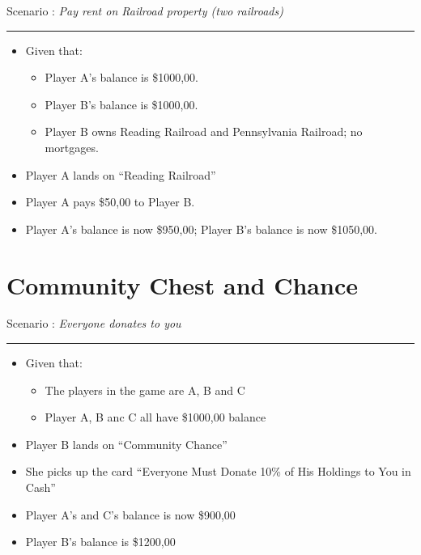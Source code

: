 \documentclass[handout,t,12pt]{beamer}
\newcommand{\Square}[1]{``#1''}
\newcommand{\Card}[1]{``#1''}
\newcommand{\money}[1]{\$#1,00}
\newcounter{scenarioid}\setcounter{scenarioid}{0}
\newenvironment{scenario}[1]{%
\addtocounter{scenarioid}{1} 
{\Large Scenario \thescenarioid: \emph{#1}\\[3px]\hrule}
\vspace{1\bigskipamount}
}{%
}
\begin{document}
  \begin{frame}
    \begin{scenario}{Pay rent on Railroad property (two railroads)}
      \begin{itemize}
        \item Given that:
        \begin{itemize}
          \item Player A's balance is \money{1000}.
          \item Player B's balance is \money{1000}.
          \item Player B owns Reading Railroad and Pennsylvania Railroad; no        mortgages.\end{itemize}
          \item Player A lands on \Square{Reading Railroad}
          \item Player A pays \money{50} to Player B.
          \item Player A's balance is now  \money{950}; Player B's balance is now \money{1050}.
      \end{itemize}
    \end{scenario}
  \end{frame}
  

  \section{Community Chest and Chance}

  \begin{frame}
    \begin{scenario}{Everyone donates to you}
      \begin{itemize}
        \item Given that:
        \begin{itemize}
          \item The players in the game are A, B and C
          \item Player A, B anc C all have \money{1000} balance
        \end{itemize}
        \item Player B lands on \Square{Community Chance}
        \item She picks up the card \Card{Everyone Must Donate 10\% of His Holdings to You in Cash}
        \item Player A's and C's balance is now \money{900}
        \item Player B's balance is \money{1200}
      \end{itemize}
    \end{scenario}
  \end{frame}
\end{document}
